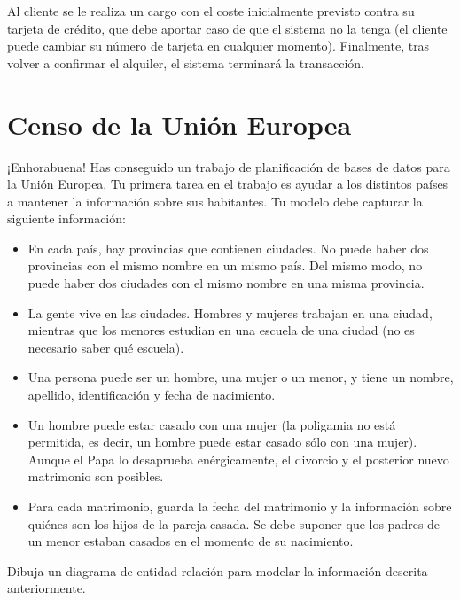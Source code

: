 \documentclass[a4paper]{article}
\begin{document}
Al cliente se le realiza un cargo con el coste inicialmente previsto contra su tarjeta de crédito, que debe aportar caso de que el sistema no la tenga (el cliente puede cambiar su número de tarjeta en cualquier momento). Finalmente, tras volver a confirmar el alquiler, el sistema terminará la transacción.

\section{Censo de la Unión Europea}
¡Enhorabuena! Has conseguido un trabajo de planificación de bases de datos para la Unión Europea. Tu primera tarea en el trabajo es ayudar a los distintos países a mantener la información sobre sus habitantes. Tu modelo debe capturar la siguiente información:
\begin{itemize}
    \item En cada país, hay provincias que contienen ciudades. No puede haber dos provincias con el mismo nombre en un mismo país. Del mismo modo, no puede haber dos ciudades con el mismo nombre en una misma provincia.
    \item La gente vive en las ciudades. Hombres y mujeres trabajan en una ciudad, mientras que los menores estudian en una escuela de una ciudad (no es necesario saber qué escuela).
    \item Una persona puede ser un hombre, una mujer o un menor, y tiene un nombre, apellido, identificación y fecha de nacimiento.
    \item Un hombre puede estar casado con una mujer (la poligamia no está permitida, es decir, un hombre puede estar casado sólo con una mujer). Aunque el Papa lo desaprueba enérgicamente, el divorcio y el posterior nuevo matrimonio son posibles.
    \item Para cada matrimonio, guarda la fecha del matrimonio y la información sobre quiénes son los hijos de la pareja casada. Se debe suponer que los padres de un menor estaban casados en el momento de su nacimiento.
\end{itemize}

Dibuja un diagrama de entidad-relación para modelar la información descrita anteriormente.
\end{document}
